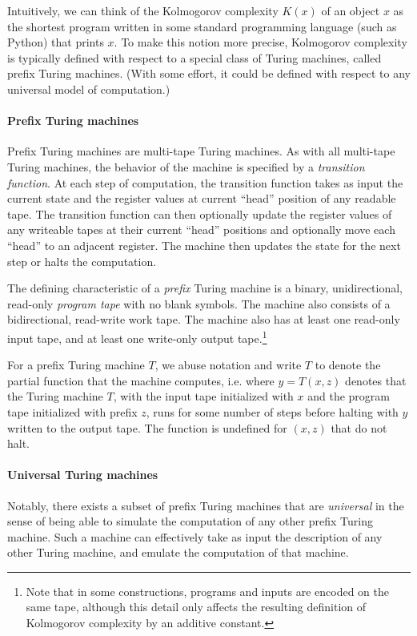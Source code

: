 Intuitively, we can think of the Kolmogorov complexity $K(x)$ of an object $x$ as the shortest program written in some standard programming language (such as Python) that prints $x$. To make this notion more precise, Kolmogorov complexity is typically defined with respect to a special class of Turing machines, called prefix Turing machines. (With some effort, it could be defined with respect to any universal model of computation.) 

\paragraph{Prefix Turing machines} Prefix Turing machines are multi-tape Turing machines. As with all multi-tape Turing machines, the behavior of the machine is specified by a \emph{transition function}. At each step of computation, the transition function takes as input the current state and the register values at current ``head'' position of any readable tape. The transition function can then optionally update the register values of any writeable tapes at their current ``head'' positions and optionally move each ``head'' to an adjacent register. The machine then updates the state for the next step or halts the computation. 

The defining characteristic of a \emph{prefix} Turing machine is a binary, unidirectional, read-only \emph{program tape} with no blank symbols. The machine also consists of a bidirectional, read-write work tape. The machine also has at least one read-only input tape, and at least one write-only output tape.\footnote{Note that in some constructions, programs and inputs are encoded on the same tape, although this detail only affects the resulting definition of Kolmogorov complexity by an additive constant.}

For a prefix Turing machine $T$, we abuse notation and write $T$ to denote the partial function that the machine computes, i.e. where $y = T(x,z)$ denotes that the Turing machine $T$, with the input tape initialized with $x$ and the program tape initialized with prefix $z$, runs for some number of steps before halting with $y$ written to the output tape. The function is undefined for $(x,z)$ that do not halt.

\paragraph{Universal Turing machines} Notably, there exists a subset of prefix Turing machines that are \emph{universal} in the sense of being able to simulate the computation of any other prefix Turing machine. Such a machine can effectively take as input the description of any other Turing machine, and emulate the computation of that machine. 

